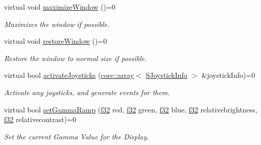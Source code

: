 \begin{DoxyCompactItemize}
\mbox{\label{classirr_1_1IrrlichtDevice_a24cb8ac97c16114ff7df1f0ec604a219}} 
virtual void \hyperlink{classirr_1_1IrrlichtDevice_a24cb8ac97c16114ff7df1f0ec604a219}{maximize\+Window} ()=0
\begin{DoxyCompactList}\small\item\em Maximizes the window if possible. \end{DoxyCompactList}\item 
\mbox{\label{classirr_1_1IrrlichtDevice_a4a92974b424cc612198505e31fe125d3}} 
virtual void \hyperlink{classirr_1_1IrrlichtDevice_a4a92974b424cc612198505e31fe125d3}{restore\+Window} ()=0
\begin{DoxyCompactList}\small\item\em Restore the window to normal size if possible. \end{DoxyCompactList}\item 
virtual bool \hyperlink{classirr_1_1IrrlichtDevice_af06f8d2c4fdffd1f879e46685bcbc6e3}{activate\+Joysticks} (\hyperlink{classirr_1_1core_1_1array}{core\+::array}$<$ \hyperlink{structirr_1_1SJoystickInfo}{S\+Joystick\+Info} $>$ \&joystick\+Info)=0
\begin{DoxyCompactList}\small\item\em Activate any joysticks, and generate events for them. \end{DoxyCompactList}\item 
\mbox{\label{classirr_1_1IrrlichtDevice_aaa6cec87ca0a18ec369ea12f7fbd490c}} 
virtual bool \hyperlink{classirr_1_1IrrlichtDevice_aaa6cec87ca0a18ec369ea12f7fbd490c}{set\+Gamma\+Ramp} (\hyperlink{namespaceirr_a0277be98d67dc26ff93b1a6a1d086b07}{f32} red, \hyperlink{namespaceirr_a0277be98d67dc26ff93b1a6a1d086b07}{f32} green, \hyperlink{namespaceirr_a0277be98d67dc26ff93b1a6a1d086b07}{f32} blue, \hyperlink{namespaceirr_a0277be98d67dc26ff93b1a6a1d086b07}{f32} relativebrightness, \hyperlink{namespaceirr_a0277be98d67dc26ff93b1a6a1d086b07}{f32} relativecontrast)=0
\begin{DoxyCompactList}\small\item\em Set the current Gamma Value for the Display. \end{DoxyCompactList}\item 
\mbox{\label{classirr_1_1IrrlichtDevice_a30c4e1716271600a88e0ca07ca030f9b}} 

\end{DoxyCompactItemize}
